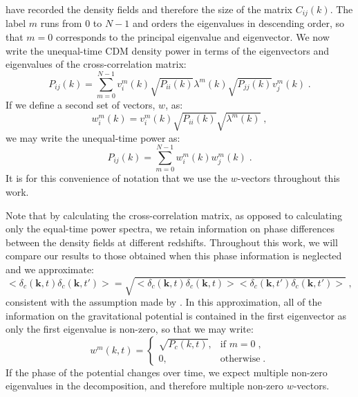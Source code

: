 \documentclass{aastex}
\begin{document}
have recorded the density
fields and therefore the size of the matrix $C_{ij}(k)$. 
The label $m$ runs from 0 to $N-1$ and orders the eigenvalues in descending order,
so that $m=0$ corresponds to the principal eigenvalue and eigenvector.
We now write the unequal-time CDM density power in
terms of the eigenvectors and eigenvalues of the cross-correlation matrix:
\begin{equation}
  P_{ij}(k) = \sum_{m=0}^{N-1} v^m_i(k) \sqrt{P_{ii}(k)} \lambda^m(k) \sqrt{P_{jj}(k)}
  v^m_j(k) \;.
\end{equation}
If we define a second set of vectors, $w$, as: 
\begin{equation}
  w^m_i(k) = v^m_i(k) \sqrt{P_{ii}(k)} \sqrt{\lambda^m(k)}  \;,
\end{equation}
we may write the unequal-time power as:
\begin{equation}\label{eqn:unequaltime}
  P_{ij}(k) = \sum_{m=0}^{N-1} w^m_i(k) w^m_j(k) \;.
\end{equation}
It is for this convenience of notation that we use the $w$-vectors
throughout this work.

Note that by calculating the cross-correlation matrix, as
opposed to calculating only the equal-time power spectra, we 
retain information on phase differences between the density
fields at different redshifts.  
Throughout this work, we will compare our
results to those obtained when this phase information is
neglected and we approximate:
\begin{equation}
  <\delta_c(\mathbf{k},t ) \delta_c(\mathbf{k},t')> = \sqrt{
    <\delta_c(\mathbf{k},t) \delta_c(\mathbf{k},t)><\delta_c(\mathbf{k},t')
    \delta_c(\mathbf{k},t')> } \;,
\end{equation}
consistent with the assumption made by \cite{yacine12}.  In this
approximation, all of the information on the gravitational potential
is contained in the first eigenvector as only the first eigenvalue is
non-zero, so that we may write:
\begin{equation}
  w^m(k,t) = 
  \begin{cases}
    \sqrt{ P_c(k, t ) }, & \text{if } m=0\;, \\
    0, & \text{otherwise} \;.
  \end{cases}
\end{equation}
If the phase of the potential changes over time, we expect 
multiple non-zero eigenvalues in the decomposition, and
therefore multiple non-zero $w$-vectors.
\end{document}
